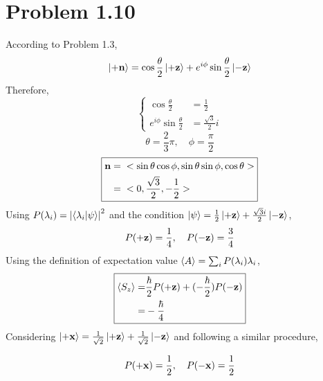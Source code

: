 \documentclass{article}
\begin{document}
\section*{Problem 1.10}

According to Problem 1.3,
\begin{equation} 
    \ket{\vb{+n}} = \cos{\frac{\theta}{2}} \ket{\vb{+z}} + e^{i\phi} \sin{\frac{\theta}{2}} \ket{\vb{-z}}
    \label{P1.10-orientation vector}
\end{equation}
Therefore,
\begin{equation} \nonumber
    \begin{cases}
        \cos{\frac{\theta}{2}} &= \frac{1}{2} \\
        e^{i\phi} \sin{\frac{\theta}{2}} &= \frac{\sqrt{3}}{2} i
    \end{cases}
\end{equation}
\begin{equation*}
    \theta ={} \frac{2}{3} \pi, \quad 
    \phi ={} \frac{\pi}{2}
\end{equation*}
\begin{equation} \nonumber
    \boxed{
    \begin{split}
        \vb{n} &={} 
    <\sin{\theta}\cos{\phi}, \sin{\theta}\sin{\phi},\cos{\theta}> \\
    &={}
    <0,\frac{\sqrt{3}}{2}, -\frac{1}{2}>
    \end{split}}
\end{equation}
Using $P(\lambda_i)=\abs{\braket{\lambda_i}{\psi}}^2$ and the condition $\ket{\psi}=\frac{1}{2}\ket{+\vb{z}}+\frac{\sqrt{3}i}{2}\ket{-\vb{z}}$,  
\begin{equation} \nonumber
    P(\vb{+z}) = \frac{1}{4}, \quad
    P(\vb{-z}) = \frac{3}{4}
\end{equation}
Using the definition of expectation value $\expval{A}=\sum_i{P(\lambda_i)\lambda_i}$,
\begin{equation*}
    \boxed{
    \begin{split}
        \expval{S_z} =&{} \frac{\hbar}{2} P(\vb{+z}) + (-\frac{\hbar}{2}) P(\vb{-z})\\
    =&{}  -\frac{\hbar}{4}
    \end{split}}
\end{equation*}
Considering $\ket{\vb{+x}} = \frac{1}{\sqrt{2}} \ket{\vb{+z}} + \frac{1}{\sqrt{2}} \ket{\vb{-z}}$ and following a similar procedure,

\begin{equation*}
    P(\vb{+x}) = \frac{1}{2}, \quad
    P(\vb{-x}) = \frac{1}{2}
\end{equation*}
\end{document}
